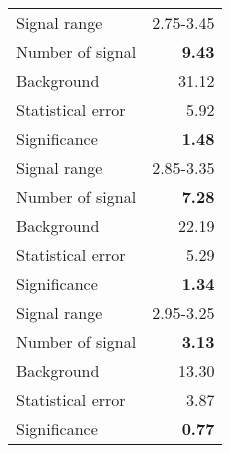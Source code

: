  {\large{
 \begin{tabular}{||l r||}
 \hline
 \hline
Signal range &      2.75-3.45 \\
Number of signal &  \textbf{   9.43} \\
Background &          31.12 \\
Statistical error &    5.92 \\
Significance &      \textbf{   1.48} \\
 \hline
Signal range &      2.85-3.35 \\
Number of signal &  \textbf{   7.28} \\
Background &          22.19 \\
Statistical error &    5.29 \\
Significance &      \textbf{   1.34} \\
 \hline
Signal range &      2.95-3.25 \\
Number of signal &  \textbf{   3.13} \\
Background &          13.30 \\
Statistical error &    3.87 \\
Significance &      \textbf{   0.77} \\
 \hline
 \hline
 \end{tabular}
 }}
 \endinput
